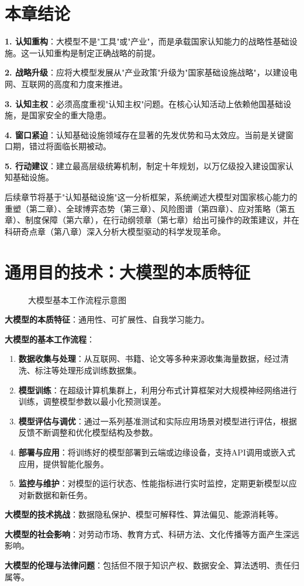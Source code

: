 \section{本章结论}

\textbf{1. 认知重构}：大模型不是"工具"或"产业"，而是承载国家认知能力的战略性基础设施。这一认知重构是制定正确战略的前提。

\textbf{2. 战略升级}：应将大模型发展从"产业政策"升级为"国家基础设施战略"，以建设电网、互联网的高度和力度来推进。

\textbf{3. 认知主权}：必须高度重视"认知主权"问题。在核心认知活动上依赖他国基础设施，是国家安全的重大隐患。

\textbf{4. 窗口紧迫}：认知基础设施领域存在显著的先发优势和马太效应。当前是关键窗口期，错过将面临长期被动。

\textbf{5. 行动建议}：建立最高层级统筹机制，制定十年规划，以万亿级投入建设国家认知基础设施。

后续章节将基于"认知基础设施"这一分析框架，系统阐述大模型对国家核心能力的重塑（第二章）、全球博弈态势（第三章）、风险图谱（第四章）、应对策略（第五章）、制度保障（第六章），在行动纲领章（第七章）给出可操作的政策建议，并在科研奇点章（第八章）深入分析大模型驱动的科学发现革命。

\section{通用目的技术：大模型的本质特征}

\begin{figure}[htbp]
    \centering
    
    \caption{大模型基本工作流程示意图}
    \label{fig:llm_process}
\end{figure}

\textbf{大模型的本质特征}：通用性、可扩展性、自我学习能力。

\textbf{大模型的基本工作流程}：

\begin{enumerate}
    \item \textbf{数据收集与处理}：从互联网、书籍、论文等多种来源收集海量数据，经过清洗、标注等处理形成训练数据集。
    \item \textbf{模型训练}：在超级计算机集群上，利用分布式计算框架对大规模神经网络进行训练，调整模型参数以最小化预测误差。
    \item \textbf{模型评估与调优}：通过一系列基准测试和实际应用场景对模型进行评估，根据反馈不断调整和优化模型结构及参数。
    \item \textbf{部署与应用}：将训练好的模型部署到云端或边缘设备，支持API调用或嵌入式应用，提供智能化服务。
    \item \textbf{监控与维护}：对模型的运行状态、性能指标进行实时监控，定期更新模型以应对新数据和新任务。
\end{enumerate}

\textbf{大模型的技术挑战}：数据隐私保护、模型可解释性、算法偏见、能源消耗等。

\textbf{大模型的社会影响}：对劳动市场、教育方式、科研方法、文化传播等方面产生深远影响。

\textbf{大模型的伦理与法律问题}：包括但不限于知识产权、数据安全、算法透明、责任归属等。

